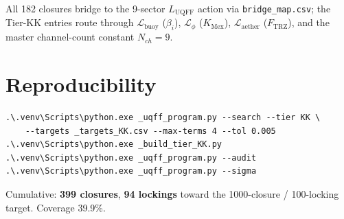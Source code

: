 \documentclass[11pt]{article}
\newcommand{\Ftrz}{F_{\mathrm{TRZ}}}
\newcommand{\KMex}{K_{\mathrm{Mex}}}
\begin{document}
All 182 closures bridge to the 9-sector $L_{\mathrm{UQFF}}$ action via
\texttt{bridge\_map.csv}; the Tier-KK entries route through
$\mathcal{L}_{\mathrm{buoy}}$ ($\beta_i$), $\mathcal{L}_{\phi}$ ($\KMex$),
$\mathcal{L}_{\mathrm{aether}}$ ($\Ftrz$), and the master channel-count
constant $N_{ch}=9$.

\section*{Reproducibility}
\begin{verbatim}
.\.venv\Scripts\python.exe _uqff_program.py --search --tier KK \
    --targets _targets_KK.csv --max-terms 4 --tol 0.005
.\.venv\Scripts\python.exe _build_tier_KK.py
.\.venv\Scripts\python.exe _uqff_program.py --audit
.\.venv\Scripts\python.exe _uqff_program.py --sigma
\end{verbatim}

\noindent Cumulative: \textbf{399 closures}, \textbf{94 lockings} toward the
1000-closure / 100-locking target. Coverage 39.9\%.
\end{document}
